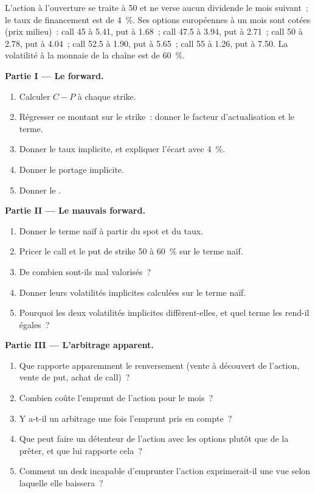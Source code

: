 \begin{problem}\label{pb:dv:dividends-borrow-and-forwards:1}
L'action à l'ouverture se traite à 50 et ne verse aucun dividende le mois suivant~; le
taux de financement est de 4~\%. Ses options européennes à un mois sont cotées (prix milieu)~: call 45 à 5.41,
put à 1.68~; call 47.5 à 3.94, put à 2.71~; call 50 à 2.78, put à 4.04~; call 52.5 à 1.90, put à 5.65~; call 55
à 1.26, put à 7.50. La volatilité à la monnaie de la chaîne est de 60~\%.

\medskip\noindent\textbf{Partie I --- Le forward.}
\begin{enumerate}
\item Calculer $C-P$ à chaque strike.
\item Régresser ce montant sur le strike~: donner le facteur d'actualisation et le terme.
\item Donner le taux implicite, et expliquer l'écart avec 4~\%.
\item Donner le portage implicite.
\item Donner le .
\end{enumerate}

\medskip\noindent\textbf{Partie II --- Le mauvais forward.}
\begin{enumerate}[resume]
\item Donner le terme naïf à partir du spot et du taux.
\item Pricer le call et le put de strike 50 à 60~\% sur le terme naïf.
\item De combien sont-ils mal valorisés~?
\item Donner leurs volatilités implicites calculées sur le terme naïf.
\item Pourquoi les deux volatilités implicites diffèrent-elles, et quel terme les rend-il égales~?
\end{enumerate}

\medskip\noindent\textbf{Partie III --- L'arbitrage apparent.}
\begin{enumerate}[resume]
\item Que rapporte apparemment le renversement (vente à découvert de l'action, vente de put, achat de call)~?
\item Combien coûte l'emprunt de l'action pour le mois~?
\item Y a-t-il un arbitrage une fois l'emprunt pris en compte~?
\item Que peut faire un détenteur de l'action avec les options plutôt que de la prêter, et
que lui rapporte cela~?
\item Comment un desk incapable d'emprunter l'action exprimerait-il une vue selon laquelle elle baissera~?
\end{enumerate}


\end{problem}
